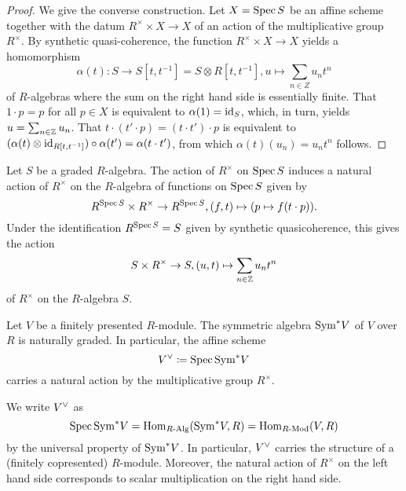 \begin{proof}
  We give the converse construction.  Let $X = \operatorname{Spec} S$ be an affine
  scheme together with the datum $R^\times \times X \to X$ of an
  action of the multiplicative group $R^\times$.  By synthetic quasi-coherence, the function $R^\times \times X \to X$ yields a homomorphism
  \begin{equation*}
    \alpha(t)\colon S \to S[t, t^{-1}] = S \otimes R[t, t^{-1}], u \mapsto \sum_{n \in Z} u_n t^n
  \end{equation*}
  of $R$-algebras where the sum on the right hand side is essentially
  finite.  That $1 \cdot p = p$ for all $p \in X$ is equivalent to
  $\alpha(1) = \mathrm{id}_S$, which, in turn, yields
  $u = \sum_{n \in \mathbb{Z}} u_n$.  That $t \cdot (t' \cdot p) = (t \cdot t') \cdot p$ is equivalent to
  $(\alpha(t) \otimes \mathrm{id}_{R[t, t^{-1}]}) \circ \alpha(t') = \alpha(t \cdot t')$, from which $\alpha(t) (u_n) = u_n t^n$ follows.
\end{proof}

\begin{remark}
  Let $S$ be a graded $R$-algebra.  The action of $R^\times$ on $\operatorname{Spec} S$ induces a natural action of $R^\times$ on the $R$-algebra of functions
  on $\operatorname{Spec} S$ given by
  \begin{equation*}
    R^{\operatorname{Spec} S} \times R^\times \to R^{\operatorname{Spec} S}, (f, t) \mapsto (p \mapsto f(t \cdot p)).
  \end{equation*}
  Under the identification $R^{\operatorname{Spec} S} = S$ given by synthetic quasicoherence, this gives the action
  \begin{equation*}
    S \times R^\times \to S, (u, t) \mapsto \sum_{n \in \mathbb{Z}} u_n t^n
  \end{equation*}
  of $R^\times$ on the $R$-algebra $S$.
\end{remark}

\begin{example}
  Let $V$ be a finitely presented $R$-module.  The symmetric algebra
  $\mathrm{Sym}^* V$ of $V$ over $R$ is naturally graded.  In particular, the
  affine scheme
  \begin{equation*}
    V\spcheck \coloneqq \Spec \Sym^* V
  \end{equation*}
  carries a natural action by the multiplicative group $R^\times$.
\end{example}

\begin{remark}
  We write $V\spcheck$ as
  \begin{equation*}
    \operatorname{Spec} \mathrm{Sym}^* V = \mathrm{Hom}_{R\text{-}\mathrm{Alg}}(\mathrm{Sym}^* V, R) = \mathrm{Hom}_{R\text{-}\mathrm{Mod}}(V, R)
  \end{equation*}
  by the universal property of $\mathrm{Sym}^* V$.  In particular, $V\spcheck$
  carries the structure of a (finitely copresented) $R$-module.
  Moreover, the natural action of $R^\times$ on the left hand side
  corresponds to scalar multiplication on the right hand side.
\end{remark}

